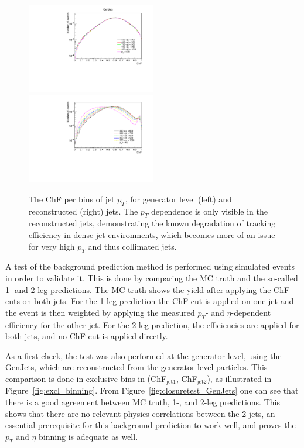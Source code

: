 \begin{figure}[ht]
  \centering
  \includegraphics[width=0.5\textwidth]{figures/ChFPerPtbin_GenJets.pdf}\hfill%
  \includegraphics[width=0.5\textwidth]{figures/ChFperPtbin.pdf}
  \caption{The ChF per bins of jet $p_T$, for generator level (left) and reconstructed (right) jets. The $p_T$ dependence is only visible in the reconstructed jets, demonstrating the known degradation of tracking efficiency in dense jet environments, which becomes more of an issue for very high $p_T$ and thus collimated jets.}
  \label{fig:pt_dependence}
\end{figure}

A test of the background prediction method is performed using simulated events in order to validate it. This is done by comparing the MC truth and the so-called 1- and 2-leg predictions. The MC truth shows the yield after applying the ChF cuts on both jets. For the 1-leg prediction the ChF cut is applied on one jet and the event is then weighted by applying the measured $p_T$- and $\eta$-dependent efficiency for the other jet. For the 2-leg prediction, the efficiencies are applied for both jets, and no ChF cut is applied directly.

As a first check, the test was also performed at the generator level, using the GenJets, which are reconstructed from the generator level particles. This comparison is done in exclusive bins in (ChF$_{\mathrm{jet 1}}$, ChF$_{\mathrm{jet 2}}$), as illustrated in Figure~\ref{fig:excl_binning}. From Figure~\ref{fig:closuretest_GenJets} one can see that there is a good agreement between MC truth, 1-, and 2-leg predictions. This shows that there are no relevant physics correlations between the 2 jets, an essential prerequisite for this background prediction to work well, and proves the $p_T$ and $\eta$ binning is adequate as well.

